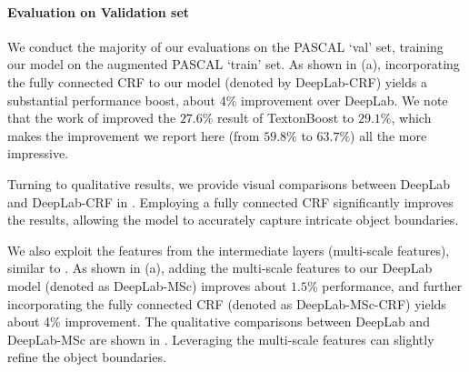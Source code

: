 \paragraph{Evaluation on Validation set} We conduct the majority of
our evaluations on the PASCAL `val' set, training our model on the
augmented PASCAL `train' set. As shown in  (a),
incorporating the fully connected CRF to our model (denoted by
DeepLab-CRF) yields a substantial performance boost, about 4\%
improvement over DeepLab. We note that the work of
\citet{krahenbuhl2011efficient} improved the $27.6\%$ result of
TextonBoost \citep{shotton2009textonboost} to $29.1\%$, which makes
the  improvement we report here (from $59.8\%$ to $63.7\%$) all the
more impressive.

Turning to qualitative results, we provide visual comparisons between
DeepLab and DeepLab-CRF in . Employing a fully
connected CRF significantly improves the results, allowing the model
to accurately capture intricate object boundaries.

We also exploit the features from the intermediate layers (\ie multi-scale features), similar to \citet{hariharan2014hypercolumns, long2014fully}. As shown in  (a), adding the multi-scale features to our DeepLab model (denoted as DeepLab-MSc) improves about $1.5\%$ performance, and further incorporating the fully connected CRF (denoted as DeepLab-MSc-CRF) yields about 4\% improvement. The qualitative comparisons between DeepLab and DeepLab-MSc are shown in . Leveraging the multi-scale features can slightly refine the object boundaries.

